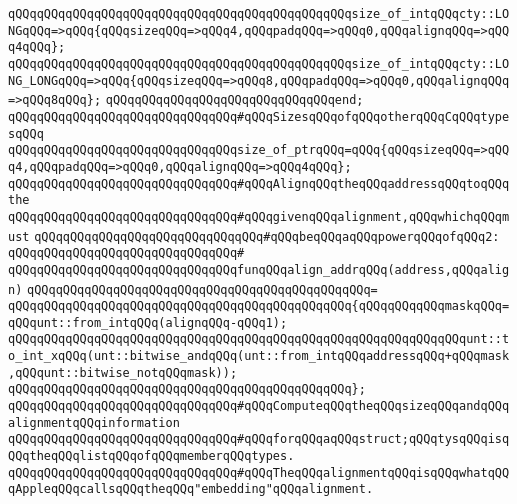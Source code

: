 \verb|qQQqqQQqqQQqqQQqqQQqqQQqqQQqqQQqqQQqqQQqqQQqqQQqsize_of_intqQQqcty::LONGqQQq=>qQQq{qQQqsizeqQQq=>qQQq4,qQQqpadqQQq=>qQQq0,qQQqalignqQQq=>qQQq4qQQq};|\newline
\verb|qQQqqQQqqQQqqQQqqQQqqQQqqQQqqQQqqQQqqQQqqQQqqQQqsize_of_intqQQqcty::LONG_LONGqQQq=>qQQq{qQQqsizeqQQq=>qQQq8,qQQqpadqQQq=>qQQq0,qQQqalignqQQq=>qQQq8qQQq};|\newline
\verb|qQQqqQQqqQQqqQQqqQQqqQQqqQQqqQQqend;|\newline
\newline
\verb|qQQqqQQqqQQqqQQqqQQqqQQqqQQqqQQq#qQQqSizesqQQqofqQQqotherqQQqCqQQqtypesqQQq|\newline
\verb|qQQqqQQqqQQqqQQqqQQqqQQqqQQqqQQqsize_of_ptrqQQq=qQQq{qQQqsizeqQQq=>qQQq4,qQQqpadqQQq=>qQQq0,qQQqalignqQQq=>qQQq4qQQq};|\newline
\newline
\verb|qQQqqQQqqQQqqQQqqQQqqQQqqQQqqQQq#qQQqAlignqQQqtheqQQqaddressqQQqtoqQQqthe|\newline
\verb|qQQqqQQqqQQqqQQqqQQqqQQqqQQqqQQq#qQQqgivenqQQqalignment,qQQqwhichqQQqmust|\newline
\verb|qQQqqQQqqQQqqQQqqQQqqQQqqQQqqQQq#qQQqbeqQQqaqQQqpowerqQQqofqQQq2:|\newline
\verb|qQQqqQQqqQQqqQQqqQQqqQQqqQQqqQQq#|\newline
\verb|qQQqqQQqqQQqqQQqqQQqqQQqqQQqqQQqfunqQQqalign_addrqQQq(address,qQQqalign)|\newline
\verb|qQQqqQQqqQQqqQQqqQQqqQQqqQQqqQQqqQQqqQQqqQQqqQQq=|\newline
\verb|qQQqqQQqqQQqqQQqqQQqqQQqqQQqqQQqqQQqqQQqqQQqqQQq{qQQqqQQqqQQqmaskqQQq=qQQqunt::from_intqQQq(alignqQQq-qQQq1);|\newline
\newline
\verb|qQQqqQQqqQQqqQQqqQQqqQQqqQQqqQQqqQQqqQQqqQQqqQQqqQQqqQQqqQQqqQQqunt::to_int_xqQQq(unt::bitwise_andqQQq(unt::from_intqQQqaddressqQQq+qQQqmask,qQQqunt::bitwise_notqQQqmask));|\newline
\verb|qQQqqQQqqQQqqQQqqQQqqQQqqQQqqQQqqQQqqQQqqQQqqQQq};|\newline
\newline
\verb|qQQqqQQqqQQqqQQqqQQqqQQqqQQqqQQq#qQQqComputeqQQqtheqQQqsizeqQQqandqQQqalignmentqQQqinformation|\newline
\verb|qQQqqQQqqQQqqQQqqQQqqQQqqQQqqQQq#qQQqforqQQqaqQQqstruct;qQQqtysqQQqisqQQqtheqQQqlistqQQqofqQQqmemberqQQqtypes.|\newline
\verb|qQQqqQQqqQQqqQQqqQQqqQQqqQQqqQQq#qQQqTheqQQqalignmentqQQqisqQQqwhatqQQqAppleqQQqcallsqQQqtheqQQq"embedding"qQQqalignment.|\newline
